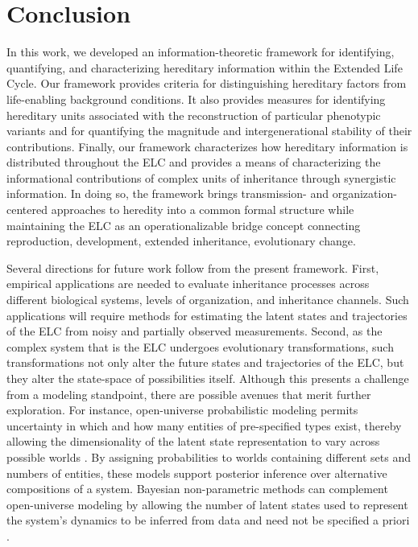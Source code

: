 \documentclass[pdflatex,sn-mathphys-num]{sn-jnl}
\theoremstyle{thmstylethree}
\theoremstyle{thmstyleone}
\begin{document}
\section{Conclusion}
In this work, we developed an information-theoretic framework for identifying, quantifying, and characterizing hereditary information within the Extended Life Cycle. Our framework provides criteria for distinguishing hereditary factors from life-enabling background conditions. It also provides measures for identifying hereditary units associated with the reconstruction of particular phenotypic variants and for quantifying the magnitude and intergenerational stability of their contributions. Finally, our framework characterizes how hereditary information is distributed throughout the ELC and provides a means of characterizing the informational contributions of complex units of inheritance through synergistic information. In doing so, the framework brings transmission- and organization-centered approaches to heredity into a common formal structure while maintaining the ELC as an operationalizable bridge concept connecting reproduction, development, extended inheritance, evolutionary change. 

Several directions for future work follow from the present framework. First, empirical applications are needed to evaluate  inheritance processes across different biological systems, levels of organization, and inheritance channels. Such applications will require methods for estimating the latent states and trajectories of the ELC from noisy and partially observed measurements. Second, as the complex system that is the ELC undergoes evolutionary transformations, such transformations not only alter the future states and trajectories of the ELC, but they alter the state-space of possibilities itself. Although this presents a challenge from a modeling standpoint, there are possible avenues that merit further exploration. For instance, open-universe probabilistic modeling permits uncertainty in which and how many entities of pre-specified types exist, thereby allowing the dimensionality of the latent state representation to vary across possible worlds \cite{milch2005blog}. By assigning probabilities to worlds containing different sets and numbers of entities, these models support posterior inference over alternative compositions of a system. Bayesian non-parametric methods can complement open-universe modeling by allowing the number of latent states used to represent the system's dynamics to be inferred from data and need not be specified a priori \cite{tonekaboni2025hdpflow}. 
\end{document}
